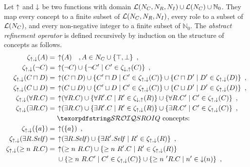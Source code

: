 \begin{definition}
  Let $\operatorname{\uparrow}$ and $\operatorname{\downarrow}$ be two functions with domain $\mathcal{L}(N_C, N_R, N_I) \cup \mathcal{L}(N_C) \cup \mathbb{N}_0$. They map every concept to a finite subset of $\mathcal{L}(N_C, N_R, N_I)$, every role to a subset of $\mathcal{L}(N_C)$, and every non-negative integer to a finite subset of $\mathbb{N}_0$.
  The \emph{abstract refinement operator} is defined recursively by induction on the structure of concepts as follows.
  \begin{align*}
    \zeta_{\refine,\corefine}(A) ={} & \refine(A) \quad, A \in N_C \cup \{\top, \bot\} \enspace, \\
    \zeta_{\refine,\corefine}(\lnot C) ={} & \refine(\lnot C) \cup \{ \lnot C' \mid C' \in \zeta_{\corefine,\refine}(C) \} \enspace, \\
    \zeta_{\refine,\corefine}(C \sqcap D) ={} & \refine(C \sqcap D) \cup \{ C' \sqcap D \mid C' \in \zeta_{\refine,\corefine}(C) \}
    \cup \{ C \sqcap D' \mid D' \in \zeta_{\refine,\corefine}(D) \} \enspace, \\
    \zeta_{\refine,\corefine}(C \sqcup D) ={} & \refine(C \sqcup D) \cup \{ C' \sqcup D \mid C' \in \zeta_{\refine,\corefine}(C) \}
    \cup \{ C \sqcup D' \mid D' \in \zeta_{\refine,\corefine}(D) \} \enspace, \\
    \zeta_{\refine,\corefine}(\forall R.C) ={} & \refine(\forall R.C) \cup \{ \forall R'.C \mid R' \in \zeta_{\corefine,\refine}(R) \}
    \cup \{ \forall R.C' \mid C' \in \zeta_{\refine,\corefine}(C) \} \enspace, \\
    \zeta_{\refine,\corefine}(\exists R.C) ={} & \refine(\exists R.C) \cup \{ \exists R'.C \mid R' \in \zeta_{\refine,\corefine}(R) \}
    \cup \{ \exists R.C' \mid C' \in \zeta_{\refine,\corefine}(C) \} \enspace, \\
    & \text{\SROIQ concepts:} \\
    \zeta_{\refine,\corefine}(\nominal a) ={} & \refine(\nominal a) \enspace, \\
    \zeta_{\refine,\corefine}(\exists R.\self) ={} & \refine(\exists R.\self) \cup \{ \exists R'.\self \mid R' \in \zeta_{\refine,\corefine}(R) \} \enspace, \\
    \zeta_{\refine,\corefine}(\more n R.C) ={} & \refine(\more n R.C) \cup \{ \more n R'.C \mid R' \in \zeta_{\refine,\corefine}(R) \} \\
    & \cup \{ \more n R.C' \mid C' \in \zeta_{\refine,\corefine}(C) \}
    \cup \{ \more n' R.C \mid n' \in \corefine(n) \} \enspace, \\

\end{align*}
\end{definition}
